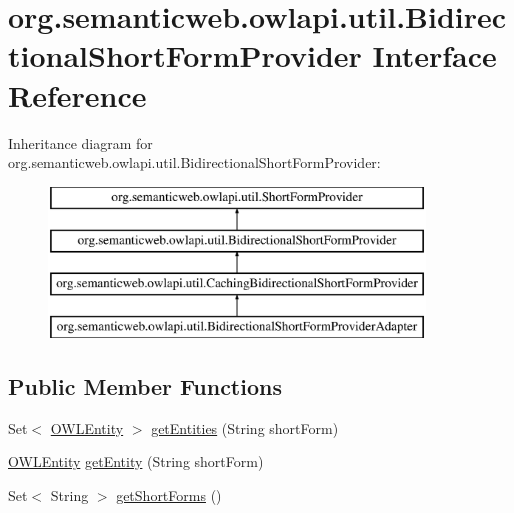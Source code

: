 \hypertarget{interfaceorg_1_1semanticweb_1_1owlapi_1_1util_1_1_bidirectional_short_form_provider}{\section{org.\-semanticweb.\-owlapi.\-util.\-Bidirectional\-Short\-Form\-Provider Interface Reference}
\label{interfaceorg_1_1semanticweb_1_1owlapi_1_1util_1_1_bidirectional_short_form_provider}
}
Inheritance diagram for org.\-semanticweb.\-owlapi.\-util.\-Bidirectional\-Short\-Form\-Provider\-:\begin{figure}[H]
\begin{center}
\leavevmode
\includegraphics[height=4.000000cm]{interfaceorg_1_1semanticweb_1_1owlapi_1_1util_1_1_bidirectional_short_form_provider}
\end{center}
\end{figure}
\subsection*{Public Member Functions}
\begin{DoxyCompactItemize}
\item 
Set$<$ \hyperlink{interfaceorg_1_1semanticweb_1_1owlapi_1_1model_1_1_o_w_l_entity}{O\-W\-L\-Entity} $>$ \hyperlink{interfaceorg_1_1semanticweb_1_1owlapi_1_1util_1_1_bidirectional_short_form_provider_ad7b7752a15f563a27e33246617947a0f}{get\-Entities} (String short\-Form)
\item 
\hyperlink{interfaceorg_1_1semanticweb_1_1owlapi_1_1model_1_1_o_w_l_entity}{O\-W\-L\-Entity} \hyperlink{interfaceorg_1_1semanticweb_1_1owlapi_1_1util_1_1_bidirectional_short_form_provider_a98406a302d6aed658022aca7a87cc7ab}{get\-Entity} (String short\-Form)
\item 
Set$<$ String $>$ \hyperlink{interfaceorg_1_1semanticweb_1_1owlapi_1_1util_1_1_bidirectional_short_form_provider_a8acf939772f74b320eff8c2b07a7294d}{get\-Short\-Forms} ()
\end{DoxyCompactItemize}


